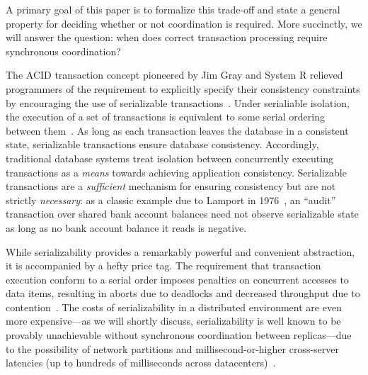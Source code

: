 A primary goal of this paper is to formalize this trade-off and state
a general property for deciding whether or not coordination is
required. More succinctly, we will answer the question: when does
correct transaction processing require synchronous coordination?


 The ACID transaction concept
pioneered by Jim Gray and System R relieved programmers of the
requirement to explicitly specify their consistency constraints by
encouraging the use of serializable
transactions~\cite{gray-virtues}. Under serialiable isolation, the
execution of a set of transactions is equivalent to some serial
ordering between them~\cite{bernstein-book}. As long as each
transaction leaves the database in a consistent state, serializable
transactions ensure database consistency. Accordingly, traditional
database systems treat isolation between concurrently executing
transactions as a \textit{means} towards achieving application
consistency. Serializable transactions are a \textit{sufficient}
mechanism for ensuring consistency but are not strictly
\textit{necessary}: as a classic example due to Lamport in
1976~\cite{lamport-audit}, an ``audit'' transaction over shared bank
account balances need not observe serializable state as long as no
bank account balance it reads is negative.


While serializability provides a remarkably powerful and convenient
abstraction, it is accompanied by a hefty price tag. The requirement
that transaction execution conform to a serial order imposes penalties
on concurrent accesses to data items, resulting in aborts due to
deadlocks and decreased throughput due to
contention~\cite{bernstein-book,gray-book,gray-virtues}. The costs of
serializability in a distributed environment are even more
expensive---as we will shortly discuss, serializability is well known
to be provably unachievable without synchronous coordination between
replicas---due to the possibility of network partitions and
millisecond-or-higher cross-server latencies (up to hundreds of
milliseconds across datacenters)~\cite{hat-vldb,bobtail}.



